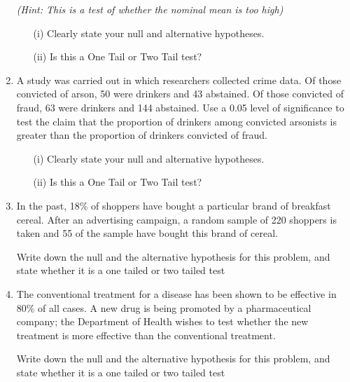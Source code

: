 \begin{enumerate}
	\textit{(Hint: This is a test of whether the nominal mean is too high)}
	
	\begin{itemize}
		\item[(i)] Clearly state your null and alternative hypotheses.
		\item[(ii)] Is this a One Tail or Two Tail test?
	\end{itemize}
\item A study was carried out in which researchers collected crime data. Of those convicted of
arson, 50 were drinkers and 43 abstained. Of those convicted of fraud, 63 were drinkers and 144
abstained. Use a 0.05 level of significance to test the claim that the proportion of drinkers among
convicted arsonists is greater than the proportion of drinkers convicted of fraud.
	\begin{itemize}
	\item[(i)] Clearly state your null and alternative hypotheses.
	\item[(ii)] Is this a One Tail or Two Tail test?
\end{itemize}

\item 
In the past, 18\% of shoppers have bought a particular brand of breakfast cereal.
After an advertising campaign, a random sample of 220 shoppers is taken and 55 of the sample have bought this brand of cereal.

Write down the null and the alternative hypothesis for this problem, and state whether it is a one tailed or two tailed test

\item The conventional treatment for a disease has been shown to be effective in
80\% of all cases. A new drug is being promoted by a pharmaceutical
company; the Department of Health wishes to test whether the new treatment
is more effective than the conventional treatment.

Write down the null and the alternative hypothesis for this problem, and state whether it is a one tailed or two tailed test


\end{enumerate}



